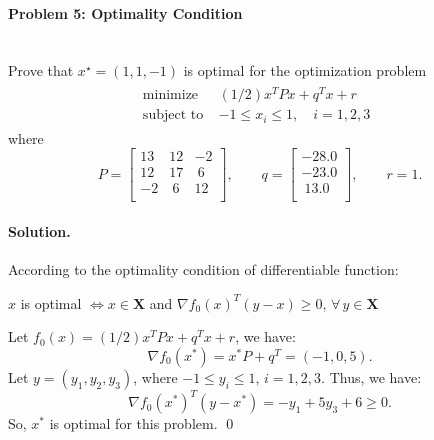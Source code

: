 \documentclass[a4paper]{article}
\newenvironment{solution}
{\color{blue} \paragraph{Solution.\\}}
{\newline \qed}
\begin{document}
\paragraph{Problem 5: Optimality Condition}
~\\
Prove that $x^\star=(1,1,-1)$ is optimal for the optimization problem
\begin{gather*}
\begin{matrix}
\text{minimize~~} & (1/2)x^TPx+q^Tx+r\quad~~\\
\text{subject to} & -1\leq x_i\leq1,\quad i=1,2,3
\end{matrix}
\end{gather*}
where
\begin{equation*}
P=\begin{bmatrix}
13&12&-2\\
12&17&~6\\
-2&~6&12\\
\end{bmatrix},\quad\quad q=\begin{bmatrix}
-28.0\\
-23.0\\
~13.0\\
\end{bmatrix},\quad\quad r=1.
\end{equation*}
\begin{solution}
	According to the optimality condition of differentiable function:
	\begin{center}
	$x$ is optimal $\iff x \in \boldsymbol{X}$ and $\nabla f_0(x)^T(y-x)\geq 0,\,\forall\,y\in\boldsymbol{X}$  
	\end{center}
Let $f_0(x)=(1/2)x^TPx+q^Tx+r$, we have:
	\begin{equation}\nonumber
	\nabla f_0(x^*) = x^*P+q^T = (-1,0,5).
	\end{equation}
Let $y=(y_1,y_2,y_3)$, where $-1\leq y_i\leq 1,\,i=1,2,3.$ Thus, we have:
	\begin{equation}\nonumber
	\nabla f_0(x^*)^T(y-x^*)=-y_1+5y_3+6\geq 0.
	\end{equation}
So, $x^*$ is optimal for this problem.
\end{solution}
\end{document}
